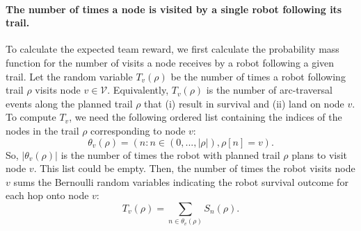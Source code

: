 \documentclass[11pt, oneside]{article}
\begin{document}
\paragraph{The number of times a node is visited by a single robot following its trail.} To calculate the expected team reward, we first calculate the probability mass function for the number of visits a node receives by a robot following a given trail.
Let the random variable $T_v(\rho)$ be the number of times a robot following trail $\rho$ visits node $v\in \mathcal{V}$.
Equivalently, $T_v(\rho)$ is the number of arc-traversal events along the planned trail $\rho$ that (i) result in survival and (ii) land on node $v$. 
To compute $T_v$, we need the following ordered list containing the indices of the nodes in the trail $\rho$ corresponding to node $v$:
\begin{equation}
	\theta_v(\rho) = (n : n \in (0, ..., \lvert \rho \rvert) ,  \rho[n] = v).
\end{equation} So, $\lvert \theta_v(\rho) \rvert$ is the number of times the robot with planned trail $\rho$ plans to visit node $v$. This list could be empty.
Then, the number of times the robot visits node $v$ sums the Bernoulli random variables indicating the robot survival outcome for each hop onto node $v$:
\begin{equation}
	T_v(\rho) = \sum_{n \in \theta_v(\rho) } S_n(\rho). %
	\label{eq:T_v}
\end{equation}
\end{document}
